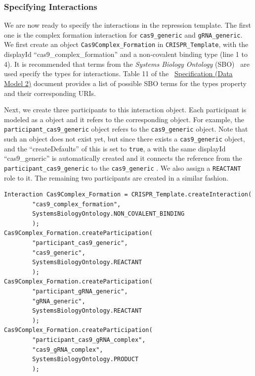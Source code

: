 \subsubsection*{Specifying Interactions}
We are now ready to specify the interactions in the repression template. The first one is the complex formation interaction for \lstinline+cas9_generic+ and \lstinline+gRNA_generic+. We first create an  object \lstinline+Cas9Complex_Formation+ in \lstinline+CRISPR_Template+, with the displayId ``cas9\_complex\_formation'' and a non-covalent binding type (line 1 to 4). It is recommended that terms from the \emph{Systems Biology Ontology} (SBO)~\cite{Courtot2011} are used specify the types for interactions. Table 11 of the ~\href{http://sbolstandard.org/downloads/specification-data-model-2-0/}{Specification  (Data Model 2)} document provides a list of possible SBO terms for the types property and their corresponding URIs. 

Next, we create three participants to this interaction object. Each participant is modeled as a  object and it refers to the corresponding  object. For example, the \lstinline+participant_cas9_generic+  object refers to the \lstinline+cas9_generic+  object. Note that such an object does not exist yet, but since there exists a \lstinline+cas9_generic+  object, and the ``createDefaults'' of this  is set to \lstinline+true+, a  with the same displayId ``cas9\_generic'' is automatically created and it connects the reference from the \lstinline+participant_cas9_generic+  to the \lstinline+cas9_generic+ . We also assign a \lstinline+REACTANT+ role to it. The remaining two participants are created in a similar fashion.

\vspace{\abovedisplayskip}
\begin{minipage}{0.95\textwidth}%
\begin{lstlisting}
Interaction Cas9Complex_Formation = CRISPR_Template.createInteraction(
        "cas9_complex_formation", 
        SystemsBiologyOntology.NON_COVALENT_BINDING
        );
Cas9Complex_Formation.createParticipation(
        "participant_cas9_generic", 
        "cas9_generic",
        SystemsBiologyOntology.REACTANT
        );
Cas9Complex_Formation.createParticipation(
        "participant_gRNA_generic", 
        "gRNA_generic",
        SystemsBiologyOntology.REACTANT
        );
Cas9Complex_Formation.createParticipation(
        "participant_cas9_gRNA_complex", 
        "cas9_gRNA_complex",
        SystemsBiologyOntology.PRODUCT
        );
\end{lstlisting}
\end{minipage}

